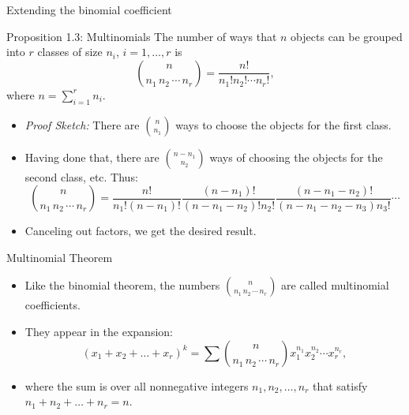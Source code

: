 \begin{frame}[allowframebreaks]{Extending the binomial coefficient}
  \begin{block}{Proposition 1.3: Multinomials}
    The number of ways that $n$ objects can be grouped into $r$ classes of size $n_i$,  $i = 1, \ldots, r$ is
    $$
    \binom{n}{n_1\,n_2\,\cdots\,n_r} = \frac{n!}{n_1!n_2!\cdots n_r!},
    $$
    where $n = \sum_{i = 1}^r n_i$.
  \end{block}
 
  \framebreak
  
  \begin{itemize}
    \item \emph{Proof Sketch:} There are $\binom{n}{n_1}$ ways to choose the objects for the first class. 
    \item Having done that, there are $\binom{n-n_1}{n_2}$ ways of choosing the objects for the second class, etc. Thus:
  $$
  \binom{n}{n_1\,n_2\,\cdots\,n_r} = \frac{n!}{n_1!(n - n_1)!}\frac{(n-n_1)!}{(n - n_1 - n_2)!n_2!}\frac{(n - n_1 - n_2)!}{(n-n_1-n_2-n_3)n_3!}\cdots
  $$
  \item Canceling out factors, we get the desired result.
  \end{itemize}

\end{frame}

\begin{frame}{Multinomial Theorem}

\begin{itemize}
  \item Like the binomial theorem, the numbers $\binom{n}{n_1\,n_2\,\cdots\,n_r}$ are called \alert{multinomial coefficients}. 
  \item They appear in the expansion: 
$$
(x_1 + x_2 + \ldots + x_r)^k = \sum \binom{n}{n_1\, n_2\, \cdots\, n_r}x_1^{n_1}x_2^{n_2}\cdots x_{r}^{n_r},
$$
  \item where the sum is over all nonnegative integers $n_1, n_2, \ldots, n_r$ that satisfy $n_1 + n_2 + \ldots + n_r = n$.
\end{itemize}

\end{frame}

